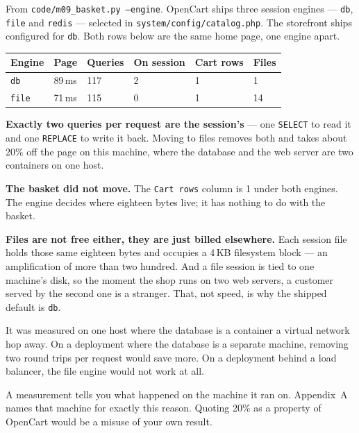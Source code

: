 \begin{measured}
From \texttt{code/m09\_basket.py --engine}. OpenCart ships three session
engines --- \texttt{db}, \texttt{file} and \texttt{redis} --- selected in
\texttt{system/config/catalog.php}. The storefront ships configured for
\texttt{db}. Both rows below are the same home page, one engine apart.

\begin{longtable}{@{}L{2.4cm}L{2.0cm}L{2.0cm}L{2.6cm}L{2.1cm}L{1.7cm}@{}}
\toprule
{}
\textbf{Engine} & \textbf{Page} & \textbf{Queries} & \textbf{On session} &
\textbf{Cart rows} & \textbf{Files} \\
\midrule
\endhead
\texttt{db} & 89\,ms & 117 & 2 & 1 & 1 \\
\texttt{file} & 71\,ms & 115 & 0 & 1 & 14 \\
\bottomrule
\end{longtable}

\smallskip
\textbf{Exactly two queries per request are the session's} --- one
\texttt{SELECT} to read it and one \texttt{REPLACE} to write it back. Moving to
files removes both and takes about 20\% off the page on this machine, where the
database and the web server are two containers on one host.

\smallskip
\textbf{The basket did not move.} The \texttt{Cart rows} column is 1 under both
engines. The engine decides where eighteen bytes live; it has nothing to do
with the basket.

\smallskip
\textbf{Files are not free either, they are just billed elsewhere.} Each session
file holds those same eighteen bytes and occupies a 4\,KB filesystem block ---
an amplification of more than two hundred. And a file session is tied to one
machine's disk, so the moment the shop runs on two web servers, a customer
served by the second one is a stranger. That, not speed, is why the shipped
default is \texttt{db}.
\end{measured}

\begin{conceptbox}
It was measured on one host where the database is a container a virtual network
hop away. On a deployment where the database is a separate machine, removing two
round trips per request would save more. On a deployment behind a load balancer,
the file engine would not work at all.

\smallskip
A measurement tells you what happened on the machine it ran on. Appendix~A names
that machine for exactly this reason. Quoting 20\% as a property of OpenCart
would be a misuse of your own result.
\end{conceptbox}

